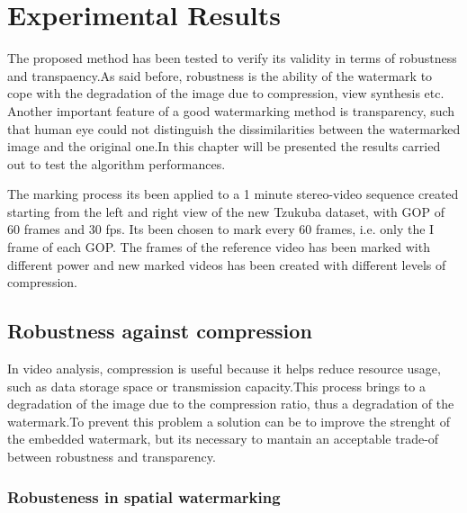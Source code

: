 \chapter{Experimental Results}
\label{exp}

The proposed method has been tested to verify its validity in terms of robustness and transpaency.\newline As said before, robustness is the ability of the watermark to cope with the degradation of the image due to compression, view synthesis etc.\newline 
Another important feature of a good watermarking method is transparency, such that human eye could not distinguish the dissimilarities between the watermarked image and the original one.\newline In this chapter will be presented the results carried out to test the algorithm performances.\newline

The marking process its been applied to a 1 minute stereo-video sequence created starting from the left and right view of the new Tzukuba dataset, with GOP of 60 frames and 30 fps.\newline 
Its been chosen to mark every 60 frames, i.e. only the I frame of each GOP.\newline 
The frames of the reference video has been marked with different power and new marked videos has been created with different levels of compression.\newline 

\section{Robustness against compression}

In video analysis, compression is useful because it helps reduce resource usage, such as data storage space or transmission capacity.\newline  This process brings to a degradation of the image due to the compression ratio, thus a degradation of the watermark.\newline  To prevent this problem a solution can be to improve the strenght of the embedded watermark, but its necessary to mantain an acceptable trade-of between robustness and transparency.


\subsection{Robusteness in spatial watermarking}

